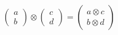 \documentclass[12pt]{article}
\begin{document}
\begin{align*}
	\begin{pmatrix}a\\b\end{pmatrix}
	 \otimes
	\begin{pmatrix}c\\d\end{pmatrix}
	 =
	\begin{pmatrix}a\otimes c\\b \otimes d\end{pmatrix}%
\end{align*}
\end{document}
